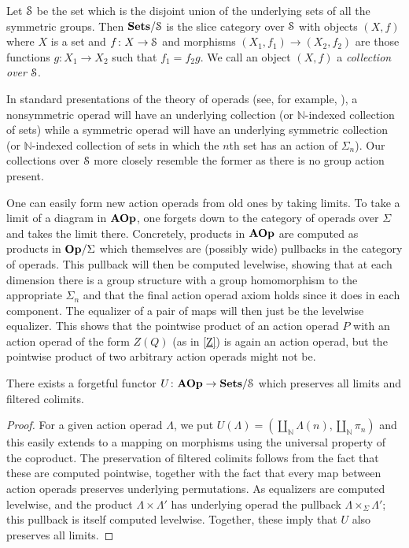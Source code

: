 \begin{Defi}
  Let $\mathcal{S}$ be the set which is the disjoint union of the underlying sets of all the symmetric groups. Then $\mathbf{Sets}/\mathcal{S}$ is the slice category over $\mathcal{S}$ with objects $(X,f)$ where $X$ is a set and $f \colon X \rightarrow \mathcal{S}$ and morphisms $(X_{1}, f_{1}) \rightarrow (X_{2}, f_{2})$ are those functions $g \colon X_{1} \rightarrow X_{2}$ such that $f_{1} = f_{2}g$. We call an object $(X,f)$ a \textit{collection over $\mathcal{S}$}.
\end{Defi}

\begin{rem}
In standard presentations of the theory of operads (see, for example, \cite{mss-op}), a nonsymmetric operad will have an underlying collection (or $\mathbb{N}$-indexed collection of sets) while a symmetric operad will have an underlying symmetric collection (or $\mathbb{N}$-indexed collection of sets in which the $n$th set has an action of $\Sigma_{n}$). Our collections over $\mathcal{S}$ more closely resemble the former as there is no group action present.
\end{rem}

\begin{example}
One can easily form new action operads from old ones by taking limits. To take a limit of a diagram in $\mathbf{AOp}$, one forgets down to the category of operads over $\Sigma$ and takes the limit there. Concretely, products in $\mathbf{AOp}$ are computed as products in $\mathbf{Op}/\Sigma$ which themselves are (possibly wide) pullbacks in the category of operads. This pullback will then be computed levelwise, showing that at each dimension there is a group structure with a group homomorphism to the appropriate $\Sigma_{n}$ and that the final action operad axiom holds since it does in each component. The equalizer of a pair of maps will then just be the levelwise equalizer. This shows that the pointwise product of an action operad $P$ with an action operad of the form $Z(Q)$ (as in \cref{Z}) is again an action operad, but the pointwise product of two arbitrary action operads might not be.
\end{example}
\begin{thm}\label{underlyingSS}
There exists a forgetful functor $U \colon \mathbf{AOp} \rightarrow \mathbf{Sets}/\mathcal{S}$ which preserves all limits and filtered colimits.
\end{thm}

\begin{proof}
For a given action operad $\Lambda$, we put $U(\Lambda) = \left(\coprod_{\mathbb{N}} \Lambda(n), \coprod_{\mathbb{N}} \pi_n \right)$ and this easily extends to a mapping on morphisms using the universal property of the coproduct. The preservation of filtered colimits follows from the fact that these are computed pointwise, together with the fact that every map between action operads preserves underlying permutations.
As equalizers are computed levelwise, and the product $\Lambda \times \Lambda'$ has underlying operad the pullback $\Lambda \times_{\Sigma} \Lambda'$; this pullback is itself computed levelwise. Together, these imply that $U$ also preserves all limits.
\end{proof}

